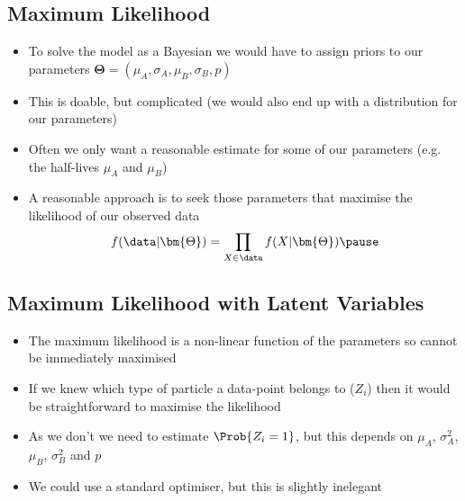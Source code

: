 
\begin{slide}
\section[-1]{Maximum Likelihood}

\begin{PauseHighLight}
  \begin{itemize}
  \item To solve the model as a Bayesian we would have to assign priors
    to our parameters $\bm{\Theta} = (\mu_A, \sigma_A, \mu_B,
    \sigma_B, p)$\pause
  \item This is doable, but complicated (we would also end up with a
    distribution for our parameters)\pause
  \item Often we only want a reasonable estimate for some of our
    parameters (e.g. the half-lives $\mu_A$ and $\mu_B$)\pause
  \item A reasonable approach is to seek those parameters that maximise the
    likelihood of our observed data
    \begin{align*}
      f(\data|\bm{\Theta}) = \prod_{X\in\data} f(X|\bm{\Theta})\pause
    \end{align*}
  \end{itemize}
\end{PauseHighLight}

\end{slide}


\Outline %

\begin{slide}
\section{Maximum Likelihood with Latent Variables}

\begin{PauseHighLight}
  \begin{itemize}
  \item The maximum likelihood is a non-linear function of the
    parameters so cannot be immediately maximised\pause
  \item If we knew which type of particle a data-point belongs to
    ($Z_i$) then it would be straightforward to maximise the
    likelihood\pause
  \item As we don't we need to estimate $\Prob{Z_i=1}$, but this
    depends on $\mu_A$, $\sigma_A^2$, $\mu_B$, $\sigma_B^2$ and $p$\pause
  \item We could use a standard optimiser, but this is slightly inelegant\pause
  \end{itemize}
\end{PauseHighLight}

\end{slide}

